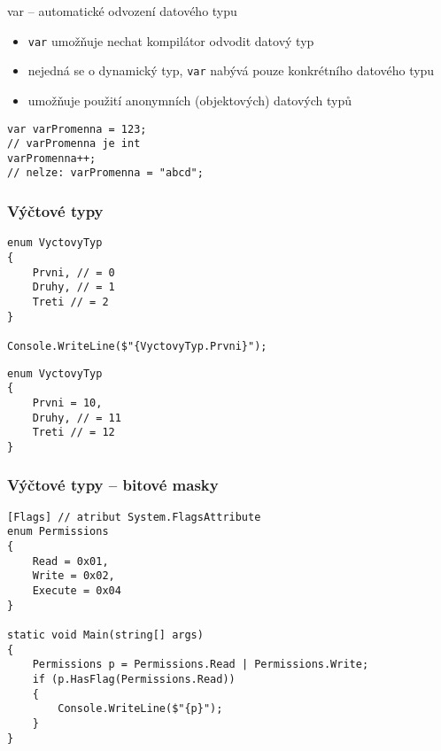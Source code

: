 \begin{frame}[fragile]
\begin{block}{var -- automatické odvození datového typu}
\begin{itemize}
\item \lstinline|var| umožňuje nechat kompilátor odvodit datový typ
\item nejedná se o dynamický typ, \lstinline|var| nabývá pouze konkrétního datového typu
\item umožňuje použití anonymních (objektových) datových typů 
\end{itemize}
\end{block}
\begin{yesblock}
\begin{lstlisting}
var varPromenna = 123;
// varPromenna je int
varPromenna++;
// nelze: varPromenna = "abcd";
\end{lstlisting}
\end{yesblock}
\end{frame}


\begin{frame}[fragile]
\frametitle{Výčtové typy}
\begin{yesblock}
\begin{lstlisting}
enum VyctovyTyp
{
    Prvni, // = 0
    Druhy, // = 1
    Treti // = 2
}

Console.WriteLine($"{VyctovyTyp.Prvni}");
\end{lstlisting}
\end{yesblock}

\begin{yesblock}
\begin{lstlisting}
enum VyctovyTyp
{
    Prvni = 10,
    Druhy, // = 11
    Treti // = 12
}
\end{lstlisting}
\end{yesblock}
\end{frame}


\begin{frame}[fragile]
\frametitle{Výčtové typy -- bitové masky}
\begin{bonusblock}{}
\begin{lstlisting}
[Flags] // atribut System.FlagsAttribute
enum Permissions
{
    Read = 0x01,
    Write = 0x02,
    Execute = 0x04
}

static void Main(string[] args)
{
    Permissions p = Permissions.Read | Permissions.Write;
    if (p.HasFlag(Permissions.Read))
    {
        Console.WriteLine($"{p}");
    }
}
\end{lstlisting}
\end{bonusblock}
\end{frame}


